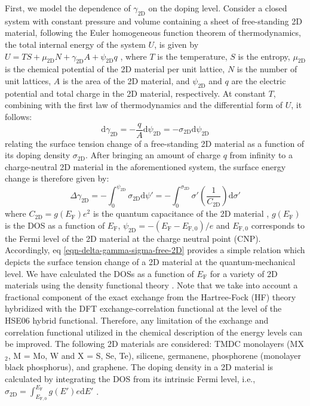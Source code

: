 \documentclass[journal=jacsat,manuscript=article,email=true]{achemso}
\begin{document}
First, we model the dependence of \(\gamma_{\mathrm{2D}}\) on the doping
level. Consider a closed system with constant pressure and volume
containing a sheet of free-standing 2D material, following the Euler
homogeneous function theorem of thermodynamics, the total internal
energy of the system \(U\), is given by \(U = TS + \mu_{\mathrm{2D}} N +
\gamma_{\mathrm{2D}} A + \psi_{\mathrm{2D}} q\)
\cite{bard_electrochemical_1980}, where \(T\) is the temperature, \(S\) is
the entropy, \(\mu_{\mathrm{2D}}\) is the chemical potential of the 2D
material per unit lattice, \(N\) is the number of unit lattices, \(A\) is
the area of the 2D material, and \(\psi_{\mathrm{2D}}\) and \(q\) are the
electric potential and total charge in the 2D material,
respectively. At constant \(T\), combining with the first law of
thermodynamics and the differential form of \(U\), it follows:
\begin{equation}
\label{eqn-dgamma-dpsi}
\mathrm{d} \gamma_{\mathrm{2D}} = -\frac{q}{A} \mathrm{d} \psi_{\mathrm{2D}}
                                = -\sigma_{\mathrm{2D}} \mathrm{d} \psi_{\mathrm{2D}}
\end{equation}
relating the surface tension change of a free-standing 2D material as
a function of its doping density \(\sigma_{\mathrm{2D}}\). After bringing an amount of charge
\(q\) from infinity to a charge-neutral 2D material in the
aforementioned system, the surface energy change is therefore given
by:
\begin{equation}
\label{eqn-delta-gamma-sigma-free-2D}
\Delta \gamma_{\mathrm{2D}} = - \int_{0}^{\psi_{\mathrm{2D}}} \sigma_{\mathrm{2D}} \mathrm{d}\psi'
                            = - \int_{0}^{\sigma_{\mathrm{2D}}} \sigma' \left( \frac{1}{C_{\mathrm{2D}}}\right) \mathrm{d} \sigma'
\end{equation}
where \(C_{\mathrm{2D}} = g(E_{\mathrm{F}}) e^{2}\) is the quantum
capacitance of the 2D material \cite{davies_two-dimensional_1997,Das_Sarma_2011},
\(g(E_{\mathrm{F}})\) is the DOS as a function of \(E_{\mathrm{F}}\),
\(\psi_{\mathrm{2D}} = -(E_{\mathrm{F}} - E_{\mathrm{F,0}})/e\) and
\(E_{\mathrm{F,0}}\) corresponds to the Fermi level of the 2D material
at the charge neutral point (CNP). Accordingly, eq
\ref{eqn-delta-gamma-sigma-free-2D} provides a simple relation which
depicts the surface tension change of a 2D material at the
quantum-mechanical level. We have calculated the DOSs as a function of
\(E_{\mathrm{F}}\) for a variety of 2D materials using the density
functional theory \cite{tian_multiscale_2016}. Note that we take into
account a fractional component of the exact exchange from the
Hartree-Fock (HF) theory hybridized with the DFT exchange-correlation
functional at the level of the HSE06 hybrid functional. Therefore, any
limitation of the exchange and correlation functional utilized in the
chemical description of the energy levels can be improved. The
following 2D materials are considered: TMDC monolayers (MX\(_{\text{2}}\), M =
Mo, W and X = S, Se, Te), silicene, germanene, phosphorene (monolayer
black phosphorus), and graphene. The doping density in a 2D material
is calculated by integrating the DOS from its intrinsic Fermi level,
i.e., \(\sigma_{\mathrm{2D}} = \int_{E_{\mathrm{F,0}}}^{E_{\mathrm{F}}}
g(E')e \mathrm{d}E'\) \cite{john_quantum_2004}.
\end{document}

